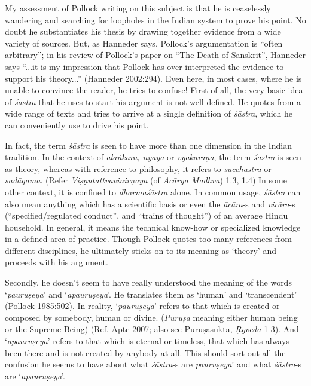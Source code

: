 My assessment of Pollock writing on this subject is that he is ceaselessly wandering and searching for loopholes in the Indian system to prove his point. No doubt he substantiates his thesis by drawing together evidence from a wide variety of sources. But, as Hanneder says, Pollock's argumentation is ``often arbitrary''; in his review of Pollock's paper on ``The Death of Sanskrit'', Hanneder says ``...it is my impression that Pollock has over-interpreted the evidence to support his theory...'' (Hanneder 2002:294). Even here, in most cases, where he is unable to convince the reader, he tries to confuse! First of all, the very basic idea of {\it śāstra} that he uses to start his argument is not well-defined. He quotes from a wide range of texts and tries to arrive at a single definition of {\it śāstra}, which he can conveniently use to drive his point. 

In fact, the term {\it śāstra} is seen to have more than one dimension in the Indian tradition. In the context of {\it alaṅkāra, nyāya} or {\it vyākaraṇa}, the term {\it śāstra} is seen as theory, whereas with reference to philosophy, it refers to {\it sacchāstra} or {\it sadāgama}. (Refer {\it Viṣṇutattvavinirṇaya} (of {\it Ācārya Madhva}) 1.3, 1.4)  In some other context, it is confined to {\it dharmaśāstra} alone. In common usage, {\it śāstra} can also mean anything which has a scientific basis or even the {\it ācāra}-s and {\it vicāra}-s (``specified/regulated conduct'', and ``trains of thought'') of an average Hindu household. In general, it means the technical know-how or specialized knowledge in a defined area of practice. Though Pollock quotes too many references from different disciplines, he ultimately sticks on to its meaning as `theory' and proceeds with his argument. 

Secondly, he doesn't seem to have really understood the meaning of the words `{\it pauruṣeya}' and `{\it apauruṣeya}'. He translates them as `human' and `transcendent' (Pollock 1985:502). In reality, `{\it pauruṣeya}' refers to that which is created or composed by somebody, human or divine. ({\it Puruṣa} meaning either human being or the Supreme Being) (Ref. Apte 2007; also see Puruṣasūkta, {\it Ṛgveda} 1-3). And `{\it apauruṣeya}' refers to that which is eternal or timeless, that which has always been there and is not created by anybody at all. This should sort out all the confusion he seems to have about what {\it śāstra}-s are {\it pauruṣeya}' and what {\it śāstra}-s are `{\it apauruṣeya}'. 

